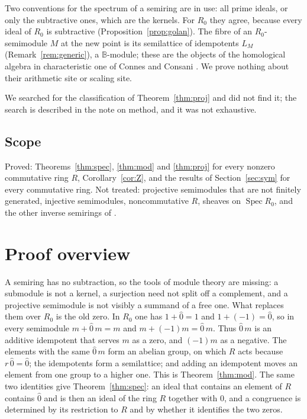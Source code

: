 \documentclass[11pt]{amsart}
\theoremstyle{remark}
\newcommand{\B}{\mathbb B}
\newcommand{\oz}{\widehat{0}}
\DeclareMathOperator{\Spec}{Spec}
\begin{document}
Two conventions for the spectrum of a semiring are in use: all prime ideals, or only the subtractive ones, which are the kernels. For $R_0$ they agree, because every ideal of $R_0$ is subtractive (Proposition~\ref{prop:golan}). The fibre of an $R_0$-semimodule $M$ at the new point is its semilattice of idempotents $L_M$ (Remark~\ref{rem:generic}), a $\B$-module; these are the objects of the homological algebra in characteristic one of Connes and Consani \cite{CC}. We prove nothing about their arithmetic site or scaling site.

We searched for the classification of Theorem~\ref{thm:proj} and did not find it; the search is described in the note on method, and it was not exhaustive.

\subsection{Scope}
Proved: Theorems~\ref{thm:spec}, \ref{thm:mod} and \ref{thm:proj} for every nonzero commutative ring $R$, Corollary~\ref{cor:Z}, and the results of Section~\ref{sec:sym} for every commutative ring. Not treated: projective semimodules that are not finitely generated, injective semimodules, noncommutative $R$, sheaves on $\Spec R_0$, and the other inverse semirings of \cite{FGJM}.

\section{Proof overview}

A semiring has no subtraction, so the tools of module theory are missing: a submodule is not a kernel, a surjection need not split off a complement, and a projective semimodule is not visibly a summand of a free one. What replaces them over $R_0$ is the old zero. In $R_0$ one has $1+\oz=1$ and $1+(-1)=\oz$, so in every semimodule $m+\oz\,m=m$ and $m+(-1)m=\oz\,m$. Thus $\oz\,m$ is an additive idempotent that serves $m$ as a zero, and $(-1)m$ as a negative. The elements with the same $\oz\,m$ form an abelian group, on which $R$ acts because $r\,\oz=\oz$; the idempotents form a semilattice; and adding an idempotent moves an element from one group to a higher one. This is Theorem~\ref{thm:mod}. The same two identities give Theorem~\ref{thm:spec}: an ideal that contains an element of $R$ contains $\oz$ and is then an ideal of the ring $R$ together with $0$, and a congruence is determined by its restriction to $R$ and by whether it identifies the two zeros.
\end{document}
